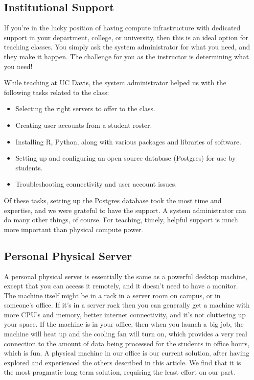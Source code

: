 \documentclass[12pt]{article}
\begin{document}
\subsection{Institutional Support}

If you're in the lucky position of having compute infrastructure with dedicated support in your department, college, or university, then this is an ideal option for teaching classes.
You simply ask the system administrator for what you need, and they make it happen.
The challenge for you as the instructor is determining what you need!

While teaching at UC Davis, the system administrator helped us with the following tasks related to the class:
\begin{itemize}
\item Selecting the right servers to offer to the class.
\item Creating user accounts from a student roster.
\item Installing R, Python, along with various packages and libraries of software.
\item Setting up and configuring an open source database (Postgres) for use by students.
\item Troubleshooting connectivity and user account issues.
\end{itemize}
Of these tasks, setting up the Postgres database took the most time and expertise, and we were grateful to have the support.
A system administrator can do many other things, of course.
For teaching, timely, helpful support is much more important than physical compute power.


\subsection{Personal Physical Server}

A personal physical server is essentially the same as a powerful desktop machine, except that you can access it remotely, and it doesn't need to have a monitor.
The machine itself might be in a rack in a server room on campus, or in someone's office.
If it's in a server rack then you can generally get a machine with more CPU's and memory, better internet connectivity, and it's not cluttering up your space.
If the machine is in your office, then when you launch a big job, the machine will heat up and the cooling fan will turn on, which provides a very real connection to the amount of data being processed for the students in office hours, which is fun.
A physical machine in our office is our current solution, after having explored and experienced the others described in this article.
We find that it is the most pragmatic long term solution, requiring the least effort on our part.
\end{document}
